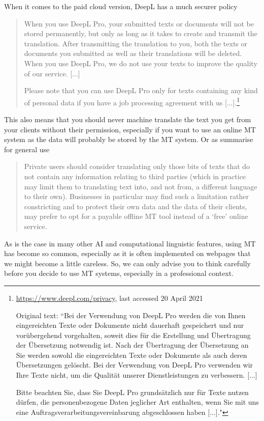 When it comes to the paid cloud version, DeepL has a much securer policy
\begin{quote}
    When you use DeepL Pro, your submitted texts or documents will not be stored permanently, but only as long as it takes to create and transmit the translation. After transmitting the translation to you, both the texts or documents you submitted as well as their translations will be deleted. When you use DeepL Pro, we do not use your texts to improve the quality of our service. [...]
    
    Please note that you can use DeepL Pro only for texts containing any kind of personal data if you have a job processing agreement with us [...].\footnote{\url{https://www.deepl.com/privacy}, last accessed 20 April 2021

    Original text: ``Bei der Verwendung von DeepL Pro werden die von Ihnen eingereichten Texte oder Dokumente nicht dauerhaft gespeichert und nur vorübergehend vorgehalten, soweit dies für die Erstellung und Übertragung der Übersetzung notwendig ist. Nach der Übertragung der Übersetzung an Sie werden sowohl die eingereichten Texte oder Dokumente als auch deren Übersetzungen gelöscht. Bei der Verwendung von DeepL Pro verwenden wir Ihre Texte nicht, um die Qualität unserer Dienstleistungen zu verbessern. [...]

    Bitte beachten Sie, dass Sie DeepL Pro grundsätzlich nur für Texte nutzen dürfen, die personenbezogene Daten jeglicher Art enthalten, wenn Sie mit uns eine Auftragsverarbeitungsvereinbarung abgeschlossen haben [...]."}
\end{quote}

This also means that you should never machine translate the text you get from your clients without their permission, especially if you want to use an online MT system as the data will probably be stored by the MT system. Or as \citet[15]{kamocki2015all} summarise for general use
\begin{quote}
    Private users should consider translating only those bits of texts that do not contain any information relating to third parties (which in practice may limit them to translating text into, and not from, a different language to their own). Businesses in particular may find such a limitation rather constricting and to protect their own data and the data of their clients, may prefer to opt for a payable offline MT tool instead of a ‘free’ online service.
\end{quote}

As is the case in many other AI and computational linguistic features, using MT has become so common, especially as it is often implemented on webpages that we might become a little careless. So, we can only advise you to think carefully before you decide to use MT systems, especially in a professional context. 

